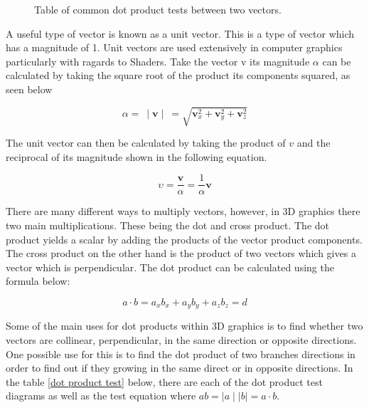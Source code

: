 \begin{figure}[htbp]
	{\centering
		\setlength{\fboxrule}{1pt}
		\vspace{7px}
		\caption{Table of common dot product tests between two vectors.}
	}
\end{figure}
\FloatBarrier

\noindent
A useful type of vector is known as a unit vector. This is a type of vector which has a magnitude of 1. Unit vectors are used extensively in computer graphics particularly with ragards to \gls{Shader}s. Take the vector v its magnitude $\alpha$ can be calculated by taking the square root of the product its components squared, as seen below 

\begin{equation}
	\alpha =~ \mid \textbf{v} \mid~ = \sqrt{\textbf{v}^2_x + \textbf{v}^2_y + \textbf{v}^2_z}
\end{equation}

The unit vector can then be calculated by taking the product of $v$ and the reciprocal of its magnitude shown in the following equation.

\begin{equation}
	\upsilon = \frac{\textbf{v}}{\alpha} = \frac{1}{\alpha} \textbf{v}
\end{equation}

There are many different ways to multiply vectors, however, in 3D graphics there two main multiplications. These being the dot and cross product. The dot product yields a scalar by adding the products of the vector product components. The cross product on the other hand is the product of two vectors which gives a vector which is perpendicular. The dot product can be calculated using the formula below: 

\begin{equation}
a \cdot b = a_x b_x + a_y b_y + a_z b_z = d
\end{equation}

\noindent
Some of the main uses for dot products within 3D graphics is to find whether two vectors are collinear, perpendicular, in the same direction or opposite directions. One possible use for this is to find the dot product of two branches directions in order to find out if they growing in the same direct or in opposite directions. In the table \ref{dot product test} below, there are each of the dot product test diagrams as well as the test equation where $ab = \mid a \mid \mid b \mid = a \cdot b$.

